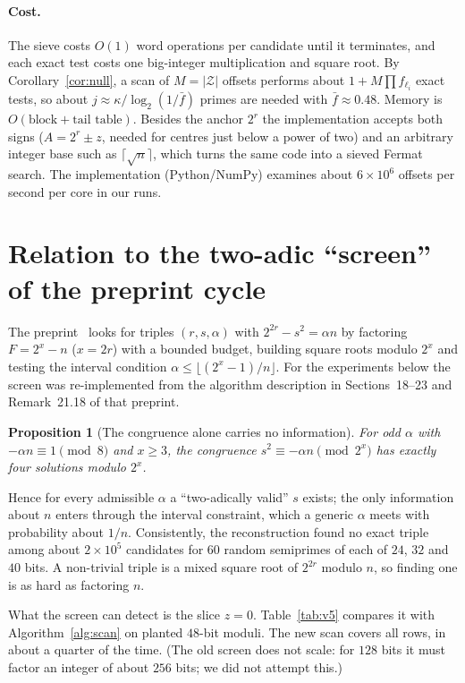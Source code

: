 \documentclass[11pt,a4paper]{article}
\newtheorem{proposition}{Proposition}[section]
\begin{document}
\paragraph{Cost.} The sieve costs $O(1)$ word operations per candidate until it terminates, and each exact test costs one big-integer multiplication and square root. By Corollary~\ref{cor:null}, a scan of $M=|\mathcal Z|$ offsets performs about $1+M\prod f_{\ell_i}$ exact tests, so about $j\approx\kappa/\log_2(1/\bar f)$ primes are needed with $\bar f\approx 0.48$. Memory is $O(\text{block}+\text{tail table})$. Besides the anchor $2^r$ the implementation accepts both signs ($A=2^r\pm z$, needed for centres just below a power of two) and an arbitrary integer base such as $\lceil\sqrt n\rceil$, which turns the same code into a sieved Fermat search. The implementation (Python/NumPy) examines about $6\times10^{6}$ offsets per second per core in our runs.

\section{Relation to the two-adic ``screen'' of the preprint cycle}\label{sec:v5}
The preprint~\cite{zenodo5} looks for triples $(r,s,\alpha)$ with $2^{2r}-s^2=\alpha n$ by factoring $F=2^{x}-n$ ($x=2r$) with a bounded budget, building square roots modulo $2^x$ and testing the interval condition $\alpha\le\lfloor(2^x-1)/n\rfloor$. For the experiments below the screen was re-implemented from the algorithm description in Sections~18--23 and Remark~21.18 of that preprint.

\begin{proposition}[The congruence alone carries no information]
For odd $\alpha$ with $-\alpha n\equiv1\pmod 8$ and $x\ge3$, the congruence $s^2\equiv-\alpha n\pmod{2^x}$ has exactly four solutions modulo $2^x$.
\end{proposition}
Hence for every admissible $\alpha$ a ``two-adically valid'' $s$ exists; the only information about $n$ enters through the interval constraint, which a generic $\alpha$ meets with probability about $1/n$. Consistently, the reconstruction found no exact triple among about $2\times10^5$ candidates for $60$ random semiprimes of each of $24$, $32$ and $40$ bits. A non-trivial triple is a mixed square root of $2^{2r}$ modulo $n$, so finding one is as hard as factoring $n$.

What the screen can detect is the slice $z=0$. Table~\ref{tab:v5} compares it with Algorithm~\ref{alg:scan} on planted $48$-bit moduli. The new scan covers all rows, in about a quarter of the time. (The old screen does not scale: for $128$ bits it must factor an integer of about $256$ bits; we did not attempt this.)
\end{document}
